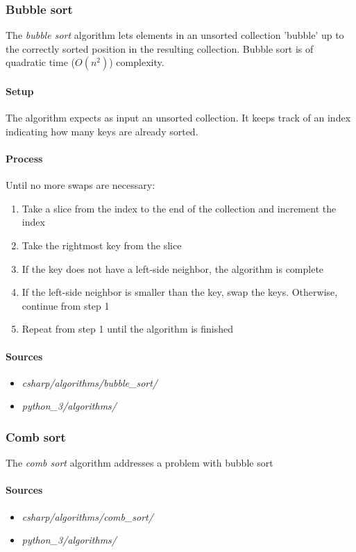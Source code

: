 \documentclass{article}
\begin{document}
\subsubsection{Bubble sort}
The {\em bubble sort} algorithm lets elements in an unsorted collection 'bubble' up to the correctly sorted position
in the resulting collection. Bubble sort is of quadratic time (\(O(n^2)\)) complexity.

\paragraph{Setup}
The algorithm expects as input an unsorted collection. It keeps track of an index indicating how many keys are
already sorted.

\paragraph{Process}
Until no more swaps are necessary:
\begin{enumerate}
\item{Take a slice from the index to the end of the collection and increment the index}
\item{Take the rightmost key from the slice}
\item{If the key does not have a left-side neighbor, the algorithm is complete}
\item{If the left-side neighbor is smaller than the key, swap the keys. Otherwise, continue from step 1}
\item{Repeat from step 1 until the algorithm is finished}
\end{enumerate}

\paragraph{Sources}
\begin{itemize}
\item{{\em csharp/algorithms/bubble\_sort/}}
\item{{\em python\_3/algorithms/}}
\end{itemize}


\subsubsection{Comb sort}
The {\em comb sort} algorithm addresses a problem with bubble sort %

\paragraph{Sources}
\begin{itemize}
\item{{\em csharp/algorithms/comb\_sort/}}
\item{{\em python\_3/algorithms/}}
\end{itemize}
\end{document}
